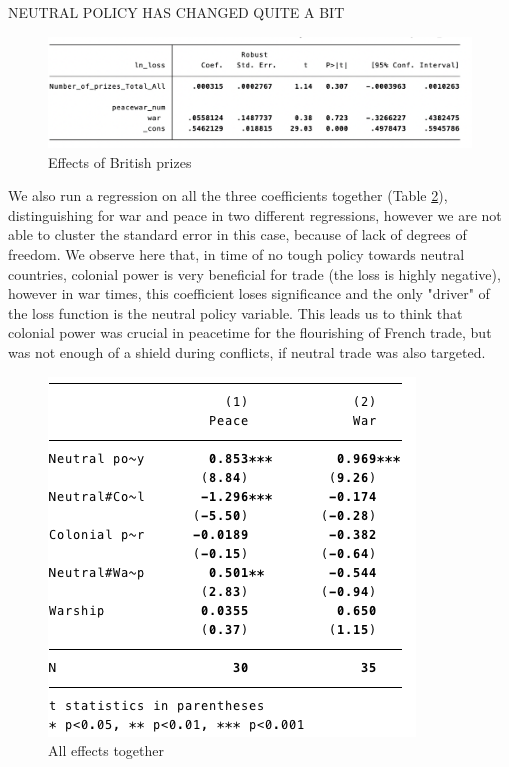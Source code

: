 \documentclass[12pt,a4paper,notitlepage,english]{article}
\begin{document}
NEUTRAL POLICY HAS CHANGED QUITE A BIT

\begin{figure}
	\centering
	\caption{Effects of British prizes}
	\label{effects_neutral_policy}
	\includegraphics[scale=.65]{reg_prizes}
\end{figure}


We also run a regression on all the three coefficients together (Table \ref{effects_together}), distinguishing for war and peace in two different regressions, however we are not able to cluster the standard error in this case, because of lack of degrees of freedom. We observe here that, in time of no tough policy towards neutral countries, colonial power is very beneficial for trade (the loss is highly negative), however in war times, this coefficient loses significance and the only "driver" of the loss function is the neutral policy variable. This leads us to think that colonial power was crucial in peacetime for the flourishing of French trade, but was not enough of a shield during conflicts, if neutral trade was also targeted. 
\begin{figure}
\centering
\caption{All effects together}
\label{effects_together}
\includegraphics[scale=.8]{reg4}
\end{figure}
\end{document}
